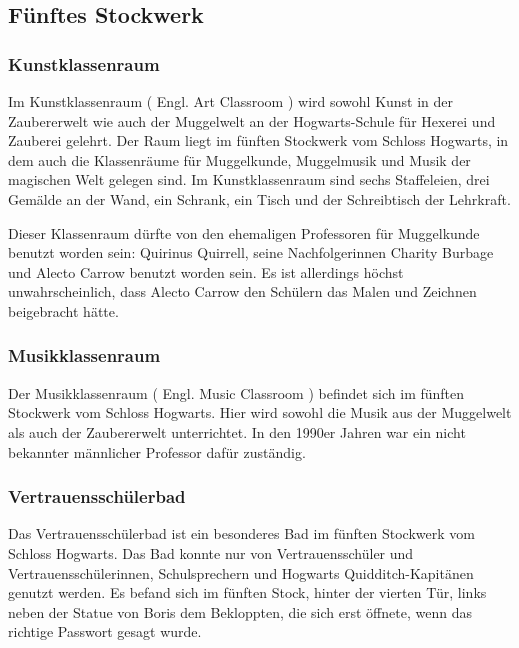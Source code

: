 \documentclass[a4paper, 10pt]{article}
\begin{document}
\subsection*{\Large Fünftes Stockwerk}

\subsubsection*{\large Kunstklassenraum}
Im Kunstklassenraum (  Engl.  Art Classroom ) wird sowohl Kunst in der Zaubererwelt wie auch der Muggelwelt an der Hogwarts-Schule für Hexerei und Zauberei gelehrt. Der Raum liegt im fünften Stockwerk vom Schloss Hogwarts, in dem auch die Klassenräume für Muggelkunde, Muggelmusik und Musik der magischen Welt gelegen sind. Im Kunstklassenraum sind sechs Staffeleien, drei Gemälde an der Wand, ein Schrank, ein Tisch und der Schreibtisch der Lehrkraft.

Dieser Klassenraum dürfte von den ehemaligen Professoren für Muggelkunde benutzt worden sein: Quirinus Quirrell, seine Nachfolgerinnen Charity Burbage und Alecto Carrow benutzt worden sein. Es ist allerdings höchst unwahrscheinlich, dass Alecto Carrow den Schülern das Malen und Zeichnen beigebracht hätte.
\subsubsection*{\large Musikklassenraum}
Der Musikklassenraum (  Engl.  Music Classroom ) befindet sich im fünften Stockwerk vom Schloss Hogwarts. Hier wird sowohl die Musik aus der Muggelwelt als auch der Zaubererwelt unterrichtet. In den 1990er Jahren war ein nicht bekannter männlicher Professor dafür zuständig.
\subsubsection*{\large Vertrauensschülerbad}
Das Vertrauensschülerbad ist ein besonderes Bad im fünften Stockwerk vom Schloss Hogwarts. Das Bad konnte nur von Vertrauensschüler und Vertrauensschülerinnen, Schulsprechern und Hogwarts Quidditch-Kapitänen genutzt werden. Es befand sich im fünften Stock, hinter der vierten Tür, links neben der Statue von Boris dem Bekloppten, die sich erst öffnete, wenn das richtige Passwort gesagt wurde.
\end{document}
